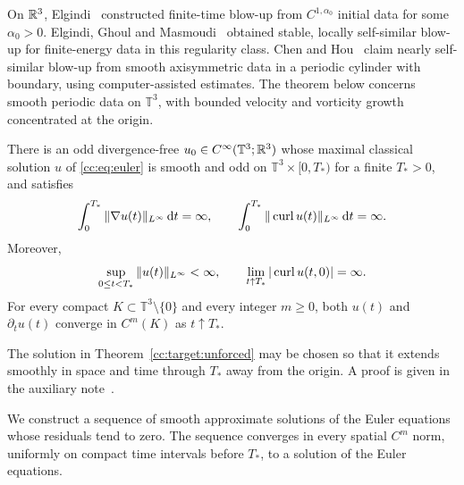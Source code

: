 On $\mathbb R^3$, Elgindi~\cite{ElgindiSingularity} constructed finite-time
blow-up from $C^{1,\alpha_0}$ initial data for some $\alpha_0>0$.
Elgindi, Ghoul and Masmoudi~\cite{ElgindiGhoulMasmoudi} obtained stable,
locally self-similar blow-up for finite-energy data in this regularity class.
Chen and Hou~\cite{ChenHouSmoothI,ChenHouSmoothII} claim nearly self-similar
blow-up from smooth axisymmetric data in a periodic cylinder with boundary,
using computer-assisted estimates. The theorem below concerns smooth
periodic data on $\mathbb T^3$, with bounded velocity and vorticity growth
concentrated at the origin.

\begin{theorem}\label{cc:target:unforced}
There is an odd divergence-free
$u_0\in C^\infty(\mathbb T^3;\mathbb R^3)$ whose maximal classical solution $u$
of \eqref{cc:eq:euler} is smooth and odd on
$\mathbb T^3\times[0,T_*)$ for a finite $T_*>0$, and satisfies
\begin{equation}\label{cc:uf:eq:main-breakdown}
 \int_0^{T_*}\|\nabla u(t)\|_{L^\infty}\,\mathrm d t=\infty,
 \qquad
 \int_0^{T_*}\|\operatorname{curl} u(t)\|_{L^\infty}\,\mathrm d t=\infty.
\end{equation}
Moreover,
\begin{equation}\label{cc:uf:eq:main-terminal}
 \sup_{0\le t<T_*}\|u(t)\|_{L^\infty}<\infty,
 \qquad \lim_{t\uparrow T_*}|\operatorname{curl} u(t,0)|=\infty.
\end{equation}
For every compact $K\subset\mathbb T^3\setminus\{0\}$ and every integer
$m\ge0$, both $u(t)$ and $\partial_tu(t)$ converge in $C^m(K)$ as
$t\uparrow T_*$.
\end{theorem}

\begin{remark}
The solution in Theorem~\ref{cc:target:unforced} may be chosen so that it
extends smoothly in space and time through $T_*$ away from the origin.
A proof is given in the auxiliary note~\cite{TerminalSmoothness}.
\end{remark}

We construct a sequence of smooth approximate solutions of the Euler
equations whose residuals tend to zero. The sequence converges in every
spatial $C^m$ norm, uniformly on compact time intervals before $T_*$, to
a solution of the Euler equations.

